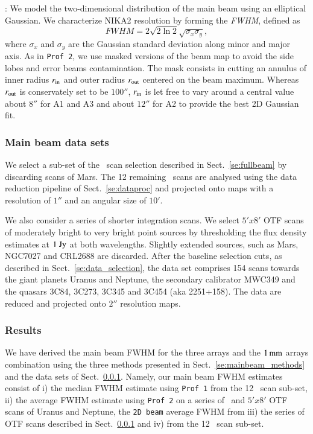 : We model the two-dimensional distribution of the main
beam using an elliptical Gaussian. We characterize NIKA2 resolution
by forming the \emph{FWHM}, defined as
\begin{equation}
  FWHM = 2 \sqrt{2\ln {2}} \sqrt{\sigma_x\sigma_y},
\end{equation}
where $\sigma_x$ and $\sigma_y$ are the Gaussian standard deviation
along minor and major axis.
As in {\tt Prof 2}, we use masked versions of the
beam map to avoid the side lobes and error beams contamination.
The mask consists in cutting an annulus of inner radius
$r_{\rm{in}}$ and outer radius $r_{\rm{out}}$ centered on the beam
maximum. Whereas $r_{\rm{out}}$ is conservately set to be $100''$,
$r_{\rm{in}}$ is let free to vary around a central value about $8''$
for A1 and A3 and about $12''$ for A2 to provide the best 2D Gaussian
fit.

\subsubsection{Main beam data sets}
\label{se:mainbeam_dataset}

We select a sub-set of the \bm\ scan selection described in
Sect.~\ref{se:fullbeam} by discarding scans of Mars.
The 12 remaining \bm\ scans are analysed using the data reduction
pipeline of Sect.~\ref{se:dataproc} and projected onto maps
with a resolution of $1''$ and an angular size of $10'$.

We also consider a series of shorter integration scans. We select $5'x8'$ OTF
scans of moderately bright to very bright point sources by
thresholding the flux density estimates at $1~\rm{Jy}$ at both
wavelengths. Slightly extended sources, such as Mars, NGC7027 and
CRL2688 are discarded. After the baseline selection cuts, as described in
Sect.~\ref{se:data_selection}, the data set comprises 154 %
scans
towards the giant planets Uranus and Neptune, the secondary calibrator
MWC349 and the quasars 3C84, 3C273, 3C345 and 3C454 (aka
2251+158). The data are reduced and projected onto $2''$ resolution
maps. 

\subsubsection{Results}
\label{se:mainbeam_results}

We have derived the main beam FWHM for the three arrays and the
$1\,\rm{mm}$ arrays combination using the three methods presented in
Sect.~\ref{se:mainbeam_methods} and the data
sets of Sect.~\ref{se:mainbeam_dataset}. Namely, our main beam FWHM estimates
consist of i) the median FWHM estimate using {\tt Prof 1} from the 12 \bm\ scan
sub-set, ii) the average FWHM estimate using {\tt Prof 2} on a series
of \bm\ and $5'x8'$ OTF scans of Uranus and Neptune, the {\tt 2D beam} average FWHM
from iii) the series of OTF scans described in
Sect.~\ref{se:mainbeam_dataset} and iv) from the 12 \bm\ scan
sub-set.

